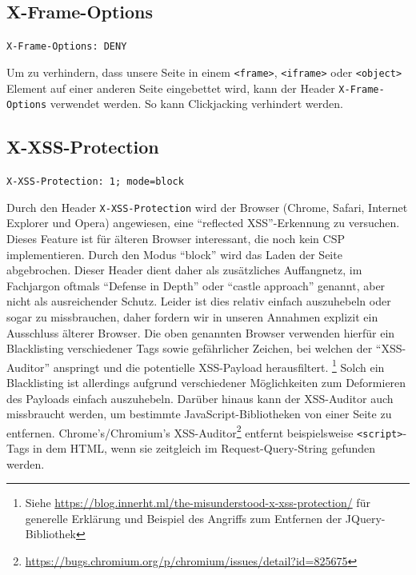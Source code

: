 \documentclass[12pt,DIV14,BCOR10mm,a4paper,parskip=half-,headsepline,headinclude,english,ngerman,bibliography=totocnumbered]{scrreprt}
\begin{document}
\subsection{X-Frame-Options}
\begin{sloppypar}
\texttt{X-Frame-Options: DENY}
\end{sloppypar}
Um zu verhindern, dass unsere Seite in einem \texttt{<frame>}, \texttt{<iframe>} oder \texttt{<object>} Element auf einer anderen Seite eingebettet wird, kann der Header \texttt{X-Frame-Options} verwendet werden. So kann Clickjacking verhindert werden. %

\subsection{X-XSS-Protection}
\label{x:xss:protection}
\begin{sloppypar}
\texttt{X-XSS-Protection: 1; mode=block}
\end{sloppypar}
Durch den Header \texttt{X-XSS-Protection} wird der Browser (Chrome, Safari, Internet Explorer und Opera) angewiesen, eine \enquote{reflected XSS}-Erkennung zu versuchen.
Dieses Feature ist für älteren Browser interessant, die noch kein CSP implementieren.
Durch den Modus \enquote{block} wird das Laden der Seite abgebrochen.
Dieser Header dient daher als zusätzliches Auffangnetz, im Fachjargon oftmals \enquote{Defense in Depth} oder \enquote{castle approach} genannt, aber nicht als ausreichender Schutz.
Leider ist dies relativ einfach auszuhebeln oder sogar zu missbrauchen, daher fordern wir in unseren Annahmen explizit ein Ausschluss älterer Browser.
Die oben genannten Browser verwenden hierfür ein Blacklisting verschiedener Tags sowie gefährlicher Zeichen, bei welchen der \enquote{XSS-Auditor} anspringt und die potentielle XSS-Payload herausfiltert.
\footnote{Siehe \url{https://blog.innerht.ml/the-misunderstood-x-xss-protection/} für generelle Erklärung und Beispiel des Angriffs zum Entfernen der JQuery-Bibliothek}
Solch ein Blacklisting ist allerdings aufgrund verschiedener Möglichkeiten zum Deformieren des Payloads einfach auszuhebeln.
Darüber hinaus kann der XSS-Auditor auch missbraucht werden, um bestimmte JavaScript-Bibliotheken von einer Seite zu entfernen.
Chrome's/Chromium's XSS-Auditor\footnote{\url{https://bugs.chromium.org/p/chromium/issues/detail?id=825675}} entfernt beispielsweise \texttt{<script>}-Tags in dem HTML, wenn sie zeitgleich im Request-Query-String gefunden werden.
\end{document}
